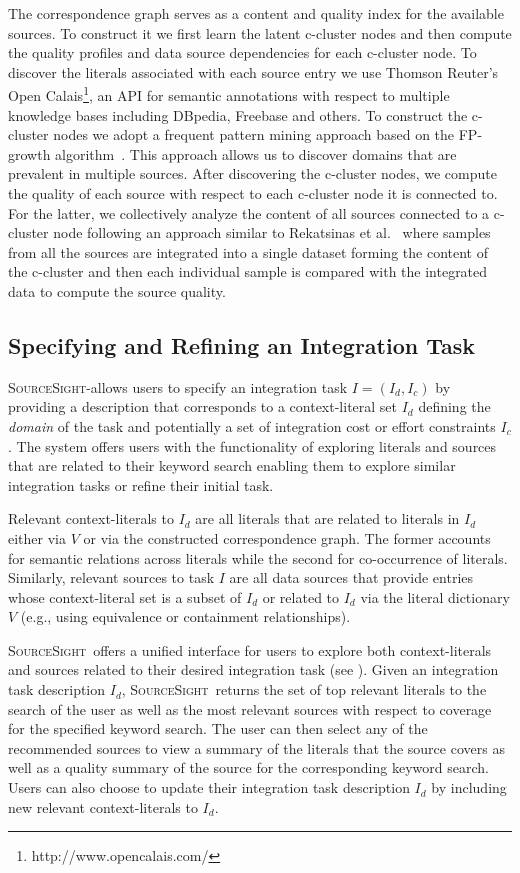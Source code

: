 \documentclass{vldb}
\newcommand\system{\textsc{SourceSight}}
\begin{document}
The correspondence graph serves as a content and quality index for the available sources. To construct it we first learn the latent c-cluster nodes and then compute the quality profiles and data source dependencies for each c-cluster node. To discover the literals associated with each source entry we use Thomson Reuter's Open Calais\footnote{http://www.opencalais.com/}, an API for semantic annotations with respect to multiple knowledge bases including DBpedia, Freebase and others. To construct the c-cluster nodes we adopt a frequent pattern mining approach based on the FP-growth algorithm~\cite{Han:2000}. This approach allows us to discover domains that are prevalent in multiple sources. After discovering the c-cluster nodes, we compute the quality of each source with respect to each c-cluster node it is connected to. For the latter, we collectively analyze the content of all sources connected to a c-cluster node following an approach similar to Rekatsinas et al.~\cite{rekatsinas:2014} where samples from all the sources are integrated into a single dataset forming the content of the c-cluster and then each individual sample is compared with the integrated data to compute the source quality. 

\subsection{Specifying and Refining an Integration Task}
\label{sec:integtask}
\system-allows users to specify an integration task $I = (I_d, I_c)$ by providing a description that corresponds to a context-literal set $I_d$ defining the {\em domain} of the task and potentially a set of integration cost or effort constraints $I_c$. The system offers users with the functionality of exploring literals and sources that are related to their keyword search enabling them to explore similar integration tasks or refine their initial task. 

Relevant context-literals to $I_d$ are all literals that are related to literals in $I_d$ either via $V$ or via the constructed correspondence graph. The former accounts for semantic relations across literals while the second for co-occurrence of literals. Similarly, relevant sources to task $I$ are all data sources that provide entries whose context-literal set is a subset of $I_d$ or related to $I_d$ via the literal dictionary $V$ (e.g., using equivalence or containment relationships). 

\system~offers a unified interface for users to explore both context-literals and sources related to their desired integration task (see ). Given an integration task description $I_d$, \system~returns the set of top relevant literals to the search of the user as well as the most relevant sources with respect to coverage for the specified keyword search. The user can then select any of the recommended sources to view a summary of the literals that the source covers as well as a quality summary of the source for the corresponding keyword search. Users can also choose to update their integration task description $I_d$ by including new relevant context-literals to $I_d$.
\end{document}
